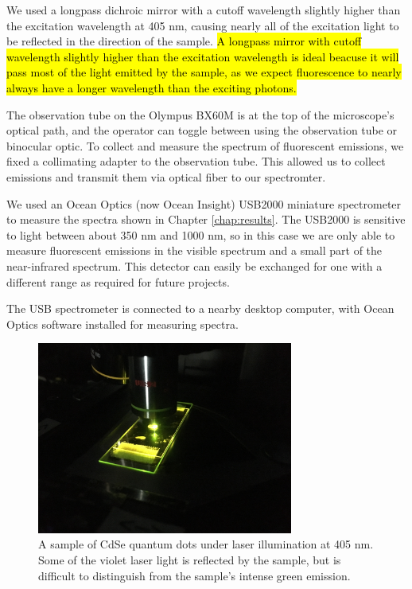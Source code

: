 We used a longpass dichroic mirror with a cutoff wavelength slightly higher than the excitation wavelength at 405 nm, causing nearly all of the excitation light to be reflected in the direction of the sample. \hl{A longpass mirror with cutoff wavelength slightly higher than the excitation wavelength is ideal beacuse it will pass most of the light emitted by the sample, as we expect fluorescence to nearly always have a longer wavelength than the exciting photons.}


The observation tube on the Olympus BX60M is at the top of the microscope's optical path, and the operator can toggle between using the observation tube or binocular optic. To collect and measure the spectrum of fluorescent emissions, we fixed a collimating adapter to the observation tube. This allowed us to collect emissions and transmit them via optical fiber to our spectromter.

We used an Ocean Optics (now Ocean Insight) USB2000 miniature spectrometer to measure the spectra shown in Chapter \ref{chap:results}. The USB2000 is sensitive to light between about 350 nm and 1000 nm, so in this case we are only able to measure fluorescent emissions in the visible spectrum and a small part of the near-infrared spectrum. This detector can easily be exchanged for one with a different range as required for future projects.

The USB spectrometer is connected to a nearby desktop computer, with Ocean Optics software installed for measuring spectra.

\begin{figure}[H]
    \centering
    \includegraphics[width=0.75\textwidth]{img/objective-sample.JPG}
    \caption[Sample on stage under laser illumination.]{A sample of CdSe quantum dots under laser illumination at 405 nm. Some of the violet laser light is reflected by the sample, but is difficult to distinguish from the sample's intense green emission.}
    \label{img:objective-sample}
\end{figure}

